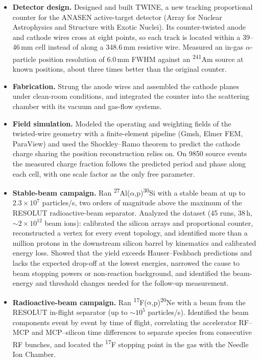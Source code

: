 \documentclass[10pt,letterpaper]{article}
\newcommand{\iso}[2]{\textsuperscript{#1}#2}
\newcommand{\ap}{(\ensuremath{\alpha},p)}
\begin{document}
\begin{itemize}
  \item \textbf{Detector design.} Designed and built TWINE, a new tracking proportional counter for the ANASEN active-target detector (Array for Nuclear Astrophysics and Structure with Exotic Nuclei). Its counter-twisted anode and cathode wires cross at eight points, so each track is located within a 39--46\,mm cell instead of along a 348.6\,mm resistive wire. Measured an in-gas \ensuremath{\alpha}-particle position resolution of 6.0\,mm FWHM against an \iso{241}{Am} source at known positions, about three times better than the original counter.
  \item \textbf{Fabrication.} Strung the anode wires and assembled the cathode planes under clean-room conditions, and integrated the counter into the scattering chamber with its vacuum and gas-flow systems.
  \item \textbf{Field simulation.} Modeled the operating and weighting fields of the twisted-wire geometry with a finite-element pipeline (Gmsh, Elmer FEM, ParaView) and used the Shockley--Ramo theorem to predict the cathode charge sharing the position reconstruction relies on. On 9850 source events the measured charge fraction follows the predicted period and phase along each cell, with one scale factor as the only free parameter.
  \item \textbf{Stable-beam campaign.} Ran \iso{27}{Al}\ap\iso{30}{Si} with a stable beam at up to $2.3\times10^{7}$ particles/s, two orders of magnitude above the maximum of the RESOLUT radioactive-beam separator. Analyzed the dataset (45 runs, 38\,h, ${\sim}2\times10^{12}$ beam ions): calibrated the silicon arrays and proportional counter, reconstructed a vertex for every event topology, and identified more than a million protons in the downstream silicon barrel by kinematics and calibrated energy loss. Showed that the yield exceeds Hauser--Feshbach predictions and lacks the expected drop-off at the lowest energies, narrowed the cause to beam stopping powers or non-reaction background, and identified the beam-energy and threshold changes needed for the follow-up measurement.
  \item \textbf{Radioactive-beam campaign.} Ran \iso{17}{F}\ap\iso{20}{Ne} with a beam from the RESOLUT in-flight separator (up to ${\sim}10^{5}$ particles/s). Identified the beam components event by event by time of flight, correlating the accelerator RF--MCP and MCP--silicon time differences to separate species from consecutive RF bunches, and located the \iso{17}{F} stopping point in the gas with the Needle Ion Chamber.

\end{itemize}
\end{document}

